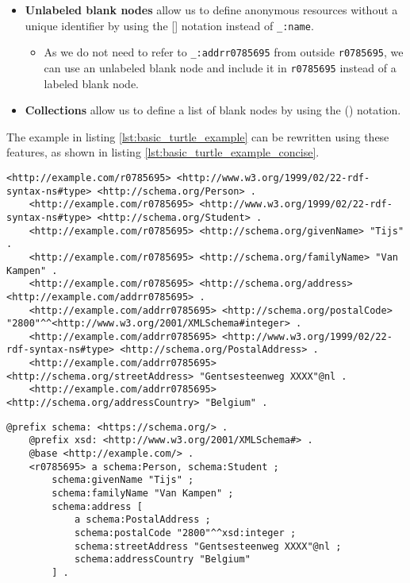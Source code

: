 \begin{itemize}
\begin{itemize}
    \end{itemize}
    \item \textbf{Unlabeled blank nodes} allow us to define anonymous resources without a unique identifier by using the [] notation instead of \texttt{\_:name}.
    \begin {itemize}
        \item As we do not need to refer to \texttt{\_:addrr0785695} from outside \texttt{r0785695}, we can use an unlabeled blank node and include it in \texttt{r0785695} instead of a labeled blank node.
    \end{itemize}
    \item \textbf{Collections} allow us to define a list of blank nodes by using the () notation.
\end{itemize}
The example in listing \ref{lst:basic_turtle_example} can be rewritten using these features, as shown in listing \ref{lst:basic_turtle_example_concise}.


\begin{lstlisting}[caption={Basic naive turtle document}, label={lst:basic_turtle_example}, captionpos=b, breaklines=true, basicstyle=\small]
    <http://example.com/r0785695> <http://www.w3.org/1999/02/22-rdf-syntax-ns#type> <http://schema.org/Person> .
    <http://example.com/r0785695> <http://www.w3.org/1999/02/22-rdf-syntax-ns#type> <http://schema.org/Student> .
    <http://example.com/r0785695> <http://schema.org/givenName> "Tijs" .
    <http://example.com/r0785695> <http://schema.org/familyName> "Van Kampen" .
    <http://example.com/r0785695> <http://schema.org/address> <http://example.com/addrr0785695> .
    <http://example.com/addrr0785695> <http://schema.org/postalCode> "2800"^^<http://www.w3.org/2001/XMLSchema#integer> .
    <http://example.com/addrr0785695> <http://www.w3.org/1999/02/22-rdf-syntax-ns#type> <http://schema.org/PostalAddress> .
    <http://example.com/addrr0785695> <http://schema.org/streetAddress> "Gentsesteenweg XXXX"@nl .
    <http://example.com/addrr0785695> <http://schema.org/addressCountry> "Belgium" .
\end{lstlisting}

\begin{lstlisting}[caption={Basic turtle document using turtle features}, label={lst:basic_turtle_example_concise}, captionpos=b, breaklines=true]
    @prefix schema: <https://schema.org/> .
    @prefix xsd: <http://www.w3.org/2001/XMLSchema#> .
    @base <http://example.com/> .
    <r0785695> a schema:Person, schema:Student ;
        schema:givenName "Tijs" ;
        schema:familyName "Van Kampen" ;
        schema:address [
            a schema:PostalAddress ;
            schema:postalCode "2800"^^xsd:integer ;
            schema:streetAddress "Gentsesteenweg XXXX"@nl ;
            schema:addressCountry "Belgium"
        ] .
\end{lstlisting}


